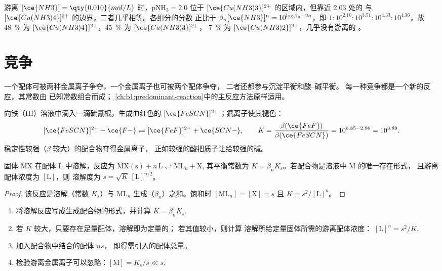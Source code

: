 \begin{example}\label{ex:b1:complexation:cu}
游离 $[\ce{NH3}] = \qty{0.010}{mol/L}$ 时，$\mathrm{pNH_3} = 2.0$ 位于
$[\ce{Cu(NH3)3}]^{2+}$ 的区域内，但靠近 2.03 处的
与 $[\ce{Cu(NH3)4}]^{2+}$ 的边界，二者几乎相等。各组分的分数
正比于 $\beta_n[\ce{NH3}]^n = 10^{\log\beta_n - 2n}$，即
$1 : 10^{2.10} : 10^{3.51} : 10^{4.33} : 10^{4.36}$，故 \qty{48}{\percent} 为
$[\ce{Cu(NH3)4}]^{2+}$，\qty{45}{\percent} 为 $[\ce{Cu(NH3)3}]^{2+}$，
\qty{7}{\percent} 为 $[\ce{Cu(NH3)2}]^{2+}$，几乎没有游离的 。
\end{example}

\section{竞争}

一个配体可被两种金属离子争夺，一个金属离子也可被两个配体争夺，
二者还都参与沉淀平衡和酸–碱平衡。
每一种竞争都是一个新的反应，其常数由
已知常数组合而成；
\cref{ch:b1:predominant-reaction}中的主反应方法原样适用。

\begin{example}\label{ex:b1:complexation:scn-f}
向铁（III）溶液中滴入一滴硫氰根，生成血红色的
$[\ce{FeSCN}]^{2+}$；氟离子使其褪色：
\[
  [\ce{FeSCN}]^{2+} + \ce{F-} \rightleftharpoons [\ce{FeF}]^{2+} + \ce{SCN-},
  \qquad K = \frac{\beta(\ce{FeF})}{\beta(\ce{FeSCN})} = 10^{6.85 - 2.96} =
  10^{3.89} .
\]
稳定性较强（$\beta$ 较大）的配合物夺得金属离子，
正如较强的酸把质子让给较强的碱。
\end{example}

\begin{proposition}[配合作用与沉淀的竞争]\label{prop:b1:complexation:competition-precipitation}
固体 MX 在配体 L 中溶解，反应为
$\mathrm{MX(s)} + n\,\mathrm{L} \rightleftharpoons \mathrm{ML}_n + \mathrm{X}$,
其平衡常数为 $K = \beta_n K_s$。若配合物是溶液中 M 的唯一存在形式，
且游离配体浓度为 $[\mathrm{L}]$，则
溶解度为 $s = \sqrt{K}\,[\mathrm{L}]^{n/2}$。
\end{proposition}

\begin{proof}
该反应是溶解（常数 $K_s$）与
$\mathrm{ML}_n$ 生成（$\beta_n$）之和。饱和时 $[\mathrm{ML}_n]
= [\mathrm{X}] = s$ 且 $K = s^2/[\mathrm{L}]^n$。
\end{proof}

\begin{method}[用配合作用溶解沉淀]\label{met:b1:complexation:dissolve-precipitate}
\begin{enumerate}
  \item 将溶解反应写成生成配合物的形式，并计算
        $K = \beta_n K_s$.
  \item 若 $K$ 较大，只要存在足量配体，溶解即为定量的；
        若其值较小，则计算
        溶解所给定量固体所需的游离配体浓度：
        $[\mathrm{L}]^n = s^2/K$.
  \item 加入配合物中结合的配体 $n s$，
        即得需引入的配体总量。
  \item 检验游离金属离子可以忽略：$[\mathrm{M}] = K_s/s
        \ll s$.
\end{enumerate}
\end{method}

